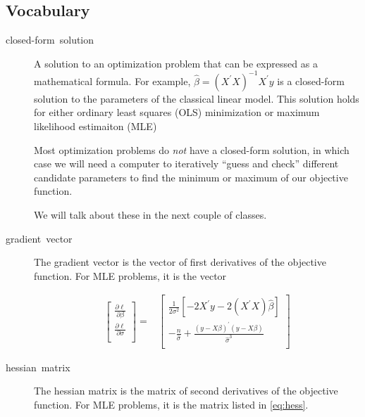 \documentclass[12pt,english]{article}
\begin{document}
\subsection{Vocabulary}
\begin{description}
    \item[closed-form~solution] A solution to an optimization problem that can be expressed as a mathematical formula. For example, $\hat{\beta} = \left(X^{\prime}X\right)^{-1}X^{\prime}y$ is a closed-form solution to the parameters of the classical linear model. This solution holds for either ordinary least squares (OLS) minimization or maximum likelihood estimaiton (MLE)

        Most optimization problems do \emph{not} have a closed-form solution, in which case we will need a computer to iteratively ``guess and check'' different candidate parameters to find the minimum or maximum of our objective function.

        We will talk about these in the next couple of classes.

    \item[gradient~vector] The gradient vector is the vector of first derivatives of the objective function. For MLE problems, it is the vector
 
        \begin{align*}
    \left[ {\begin{array}{c}
                \frac{\partial\ell}{\partial\beta}  \\
                \frac{\partial\ell}{\partial\sigma} \\
                  \end{array} } \right]
                  =&
    \left[ {\begin{array}{c}
\frac{1}{2\sigma^{2}}\left[-2X^{\prime}y -2\left(X^{\prime}X\right)\hat{\beta}\right] \\
-\frac{n}{\hat{\sigma}} +  \frac{\left(y-X\beta\right)^{\prime}\left(y-X\beta\right)}{\hat{\sigma}^{3}} \\
                  \end{array} } \right]
        \end{align*}

\item[hessian~matrix] The hessian matrix is the matrix of second derivatives of the objective function. For MLE problems, it is the matrix listed in \eqref{eq:hess}.

\end{description}
\end{document}
